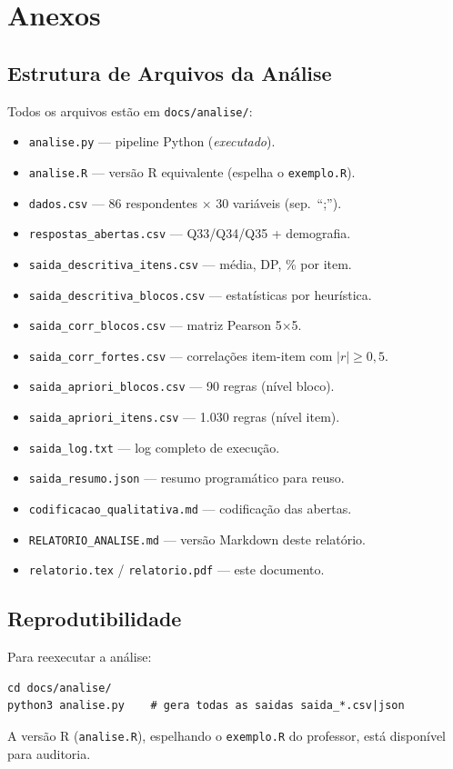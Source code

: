 \documentclass[12pt,a4paper]{article}
\begin{document}
\appendix
\section{Anexos}

\subsection{Estrutura de Arquivos da Análise}
Todos os arquivos estão em \texttt{docs/analise/}:

\begin{itemize}[leftmargin=*, itemsep=1pt]
  \item \texttt{analise.py} --- pipeline Python (\emph{executado}).
  \item \texttt{analise.R} --- versão R equivalente (espelha o \texttt{exemplo.R}).
  \item \texttt{dados.csv} --- 86 respondentes $\times$ 30 variáveis (sep.\ ``;'').
  \item \texttt{respostas\_abertas.csv} --- Q33/Q34/Q35 + demografia.
  \item \texttt{saida\_descritiva\_itens.csv} --- média, DP, \% por item.
  \item \texttt{saida\_descritiva\_blocos.csv} --- estatísticas por heurística.
  \item \texttt{saida\_corr\_blocos.csv} --- matriz Pearson 5$\times$5.
  \item \texttt{saida\_corr\_fortes.csv} --- correlações item-item com $|r| \geq 0{,}5$.
  \item \texttt{saida\_apriori\_blocos.csv} --- 90 regras (nível bloco).
  \item \texttt{saida\_apriori\_itens.csv} --- 1.030 regras (nível item).
  \item \texttt{saida\_log.txt} --- log completo de execução.
  \item \texttt{saida\_resumo.json} --- resumo programático para reuso.
  \item \texttt{codificacao\_qualitativa.md} --- codificação das abertas.
  \item \texttt{RELATORIO\_ANALISE.md} --- versão Markdown deste relatório.
  \item \texttt{relatorio.tex} / \texttt{relatorio.pdf} --- este documento.
\end{itemize}

\subsection{Reprodutibilidade}
Para reexecutar a análise:

\begin{lstlisting}[style=pystyle, caption={Comando de execução.}]
cd docs/analise/
python3 analise.py    # gera todas as saidas saida_*.csv|json
\end{lstlisting}

A versão R (\texttt{analise.R}), espelhando o \texttt{exemplo.R} do professor,
está disponível para auditoria.
\end{document}

